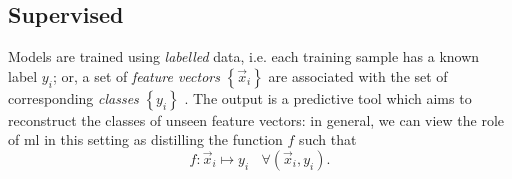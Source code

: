 \subsection{Supervised }
Models are trained using \emph{labelled} data, 
    i.e. each training sample has a known label $y_i$;
    or, a set of \emph{feature vectors} $\left\{\vec{x}_i\right\}$ are associated with the set of 
    corresponding \emph{classes} $\left\{ y_i \right\}$ \cite{caruana2006empirical}. 
The output is a predictive tool which aims to reconstruct the classes of unseen feature vectors:
    in general, we can view the role of \gls{ml} in this setting as distilling the function $f$ such that 
\begin{equation}
    \label{eqn:supervised_ml_target}
    f : \vec{x}_i \longmapsto y_i \ \ \ \  \forall (\vec{x}_i, y_i).
\end{equation}
\par 

\par 

